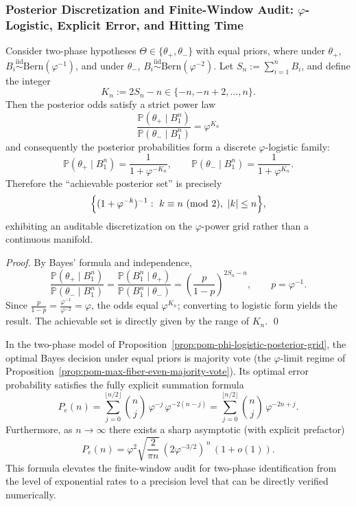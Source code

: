 \subsubsection{Posterior Discretization and Finite-Window Audit: \texorpdfstring{$\varphi$}{phi}-Logistic, Explicit Error, and Hitting Time}

\begin{proposition}\label{prop:pom-phi-logistic-posterior-grid}
Consider two-phase hypotheses \(\Theta\in\{\theta_+,\theta_-\}\) with equal priors, where under \(\theta_+\),
\(
B_i\stackrel{\mathrm{iid}}{\sim}\mathrm{Bern}(\varphi^{-1})
\),
and under \(\theta_-\),
\(
B_i\stackrel{\mathrm{iid}}{\sim}\mathrm{Bern}(\varphi^{-2})
\).
Let \(S_n:=\sum_{i=1}^{n}B_i\), and define the integer
\[
K_n:=2S_n-n\in\{-n,-n+2,\dots,n\}.
\]
Then the posterior odds satisfy a strict power law
\[
\boxed{\;
\frac{\mathbb{P}(\theta_+\mid B_1^n)}{\mathbb{P}(\theta_-\mid B_1^n)}=\varphi^{K_n}\;}
\]
and consequently the posterior probabilities form a discrete \(\varphi\)-logistic family:
\[
\boxed{\;
\mathbb{P}(\theta_+\mid B_1^n)=\frac{1}{1+\varphi^{-K_n}},\qquad
\mathbb{P}(\theta_-\mid B_1^n)=\frac{1}{1+\varphi^{K_n}}.\;}
\]
Therefore the ``achievable posterior set'' is precisely
\[
\Bigl\{(1+\varphi^{-k})^{-1}:\ k\equiv n\ (\mathrm{mod}\ 2),\ |k|\le n\Bigr\},
\]
exhibiting an auditable discretization on the \(\varphi\)-power grid rather than a continuous manifold.
\end{proposition}

\begin{proof}
By Bayes' formula and independence,
\[
\frac{\mathbb{P}(\theta_+\mid B_1^n)}{\mathbb{P}(\theta_-\mid B_1^n)}
=\frac{\mathbb{P}(B_1^n\mid\theta_+)}{\mathbb{P}(B_1^n\mid\theta_-)}
=\left(\frac{p}{1-p}\right)^{2S_n-n},
\qquad p=\varphi^{-1}.
\]
Since \(\frac{p}{1-p}=\frac{\varphi^{-1}}{\varphi^{-2}}=\varphi\), the odds equal \(\varphi^{K_n}\); converting to logistic form yields the result.
The achievable set is directly given by the range of \(K_n\). \qed
\end{proof}

\begin{theorem}\label{thm:pom-bayes-error-explicit-sharp-asymptotic}
In the two-phase model of Proposition~\ref{prop:pom-phi-logistic-posterior-grid}, the optimal Bayes decision under equal priors is majority vote (the \(\varphi\)-limit regime of Proposition~\ref{prop:pom-max-fiber-even-majority-vote}).
Its optimal error probability satisfies the fully explicit summation formula
\[
\boxed{\;
P_e(n)=\sum_{j=0}^{\lfloor n/2\rfloor}\binom{n}{j}\,\varphi^{-j}\,\varphi^{-2(n-j)}
=\sum_{j=0}^{\lfloor n/2\rfloor}\binom{n}{j}\,\varphi^{-2n+j}.\;}
\]
Furthermore, as \(n\to\infty\) there exists a sharp asymptotic (with explicit prefactor)
\[
\boxed{\;
P_e(n)=\varphi^{2}\sqrt{\frac{2}{\pi n}}\,(2\varphi^{-3/2})^{\,n}\,(1+o(1)).\;}
\]
This formula elevates the finite-window audit for two-phase identification from the level of exponential rates to a precision level that can be directly verified numerically.
\end{theorem}

